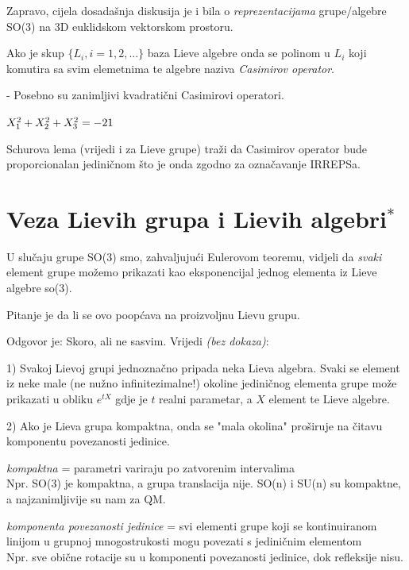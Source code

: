 Zapravo, cijela dosadašnja diskusija je i bila o 
\emph{reprezentacijama} grupe/algebre  SO(3) na 3D euklidskom 
vektorskom prostoru.

\begin{definicija}
Ako je skup $\{L_i, i=1,2, ... \}$ baza Lieve algebre onda se polinom
u $L_i$ koji komutira sa svim elemetnima te algebre naziva 
\emph{Casimirov operator}.
\end{definicija}

- Posebno su zanimljivi kvadratični Casimirovi operatori.

\begin{primjer}
$X_{1}^2 + X_{2}^2 + X_{3}^2 = -2 1 $

Schurova lema (vrijedi i za Lieve grupe) traži da Casimirov operator 
bude proporcionalan jediničnom što je onda zgodno za označavanje IRREPSa.
\end{primjer}

\section{Veza Lievih grupa i Lievih algebri$^*$}

U slučaju grupe SO(3) smo, zahvaljujući Eulerovom teoremu, vidjeli da
\emph{svaki} element grupe možemo prikazati kao eksponencijal jednog
elementa iz Lieve algebre so(3).

Pitanje je da li se ovo poopćava na proizvoljnu Lievu grupu.

Odgovor je: Skoro, ali ne sasvim. Vrijedi \emph{(bez dokaza)}:

1) Svakoj Lievoj grupi jednoznačno pripada neka Lieva algebra. Svaki 
  se element iz neke male (ne nužno infinitezimalne!) okoline 
  jediničnog elementa grupe može
  prikazati u obliku $e^{t X}$ gdje je $t$ realni parametar, a $X$ element
  te Lieve algebre.

2) Ako je Lieva grupa kompaktna, onda se "mala okolina" proširuje na
   čitavu komponentu povezanosti jedinice.

\emph{kompaktna} = parametri variraju po zatvorenim intervalima\\
   Npr. SO(3) je kompaktna, a grupa translacija nije. SO(n) i SU(n) su
 kompaktne, a najzanimljivije su nam za QM.

\emph{komponenta povezanosti jedinice} = svi elementi grupe koji se
kontinuiranom linijom u grupnoj mnogostrukosti mogu povezati s
jediničnim elementom\\
 Npr. sve obične rotacije su u komponenti povezanosti
jedinice, dok refleksije nisu.

